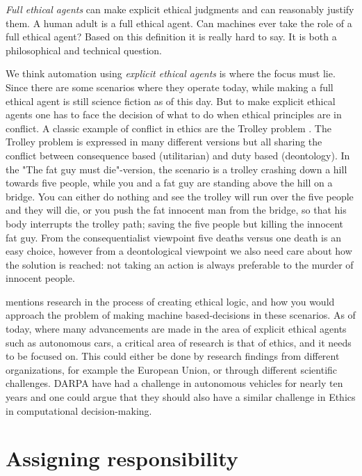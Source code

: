 \documentclass[11pt]{article}
\begin{document}
\textit{Full ethical agents} can make explicit ethical judgments and can reasonably justify them. A human adult is a full ethical agent. Can machines ever take the role of a full ethical agent? Based on this definition it is really hard to say. It is both a philosophical and technical question.

We think automation using \textit{explicit ethical agents} is where the focus must lie. Since there are some scenarios where they operate today, while making a full ethical agent is still science fiction as of this day. But to make explicit ethical agents one has to face the decision of what to do when ethical principles are in conflict. A classic example of conflict in ethics are the Trolley problem \cite{Chatfield2014automate}. The Trolley problem is expressed in many different versions but all sharing the conflict between consequence based (utilitarian) and duty based (deontology). In the "The fat guy must die"-version, the scenario is a trolley crashing down a hill towards five people, while you and a fat guy are standing above the hill on a bridge. You can either do nothing and see the trolley will run over the five people and they will die, or you push the fat innocent man from the bridge, so that his body interrupts the trolley path; saving the five people but killing the innocent fat guy. From the consequentialist viewpoint five deaths versus one death is an easy choice, however from a deontological viewpoint we also need care about how the solution is reached: not taking an action is always preferable to the murder of innocent people. 

\citeauthor{moor2006nature} mentions research in the process of creating ethical logic, and how you would approach the problem of making machine based-decisions in these scenarios.
As of today, where many advancements are made in the area of explicit ethical agents such as autonomous cars, a critical area of research is that of ethics, and it needs to be focused on. This could either be done by research findings from different organizations, for example the European Union, or through different scientific challenges. DARPA have had a challenge in autonomous vehicles for nearly ten years \cite{darpa2006} and one could argue that they should also have a similar challenge in Ethics in computational decision-making.

\section{Assigning responsibility}
\end{document}
